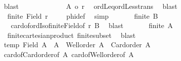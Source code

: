 \begin{isabellebody}
\ blast\isanewline
\ \ \ \ \isacommand{{\isacharbraceright}{\kern0pt}}\isamarkupfalse%
\isanewline
\ \ \ \ \isamarkupfalse%
\ \isamarkupfalse%
\ {}{}{\isacharcolon}{\kern0pt}\ {\isachardoublequoteopen}{\isacharbar}{\kern0pt}A{}{\isacharbar}{\kern0pt}\ {\isacharless}{\kern0pt}o\ r{\isachardoublequoteclose}\ \isamarkupfalse%
\ ordLeq{\isacharunderscore}{\kern0pt}ordLess{\isacharunderscore}{\kern0pt}trans\ \isamarkupfalse%
\ blast\isanewline
\ \ \ \ \isanewline
\ \ \ \ \isamarkupfalse%
\ {\isachardoublequoteopen}{\isasymnot}\ finite\ {\isacharparenleft}{\kern0pt}Field\ r{\isacharparenright}{\kern0pt}{\isachardoublequoteclose}\ \isamarkupfalse%
\ {}\ \isamarkupfalse%
\ phi{\isacharunderscore}{\kern0pt}def\ \isamarkupfalse%
\ simp\isanewline
\ \ \ \ \isamarkupfalse%
\ {\isachardoublequoteopen}{\isasymnot}\ finite\ {\isacharquery}{\kern0pt}B{\isachardoublequoteclose}\ \isamarkupfalse%
\ {}\ {}\ card{\isacharunderscore}{\kern0pt}of{\isacharunderscore}{\kern0pt}ordIso{\isacharunderscore}{\kern0pt}finite{\isacharunderscore}{\kern0pt}Field{\isacharbrackleft}{\kern0pt}of\ r\ {\isacharquery}{\kern0pt}B{\isacharbrackright}{\kern0pt}\ \isamarkupfalse%
\ blast\isanewline
\ \ \ \ \isamarkupfalse%
\ {\isachardoublequoteopen}{\isasymnot}\ finite\ A{}{\isachardoublequoteclose}\ \isamarkupfalse%
\ {}\ finite{\isacharunderscore}{\kern0pt}cartesian{\isacharunderscore}{\kern0pt}product\ finite{\isacharunderscore}{\kern0pt}subset\ \isamarkupfalse%
\ blast\isanewline
\ \ \ \ \isamarkupfalse%
\ \isamarkupfalse%
\ temp{}{\isacharcolon}{\kern0pt}\ {\isachardoublequoteopen}Field\ {\isacharbar}{\kern0pt}A{}{\isacharbar}{\kern0pt}\ {\isacharequal}{\kern0pt}\ A{}\ {\isasymand}\ Well{\isacharunderscore}{\kern0pt}order\ {\isacharbar}{\kern0pt}A{}{\isacharbar}{\kern0pt}\ {\isasymand}\ Card{\isacharunderscore}{\kern0pt}order\ {\isacharbar}{\kern0pt}A{}{\isacharbar}{\kern0pt}{\isachardoublequoteclose}\isanewline
\ \ \ \ \isamarkupfalse%
\ card{\isacharunderscore}{\kern0pt}of{\isacharunderscore}{\kern0pt}Card{\isacharunderscore}{\kern0pt}order{\isacharbrackleft}{\kern0pt}of\ A{}{\isacharbrackright}{\kern0pt}\ card{\isacharunderscore}{\kern0pt}of{\isacharunderscore}{\kern0pt}Well{\isacharunderscore}{\kern0pt}order{\isacharbrackleft}{\kern0pt}of\ A{}{\isacharbrackright}{\kern0pt}\isanewline

\end{isabellebody}
